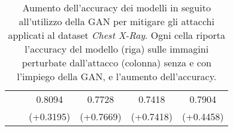 \begin{table}[!h]
\begin{tabular}{|c||c|c|c|c|c|}
                                       & & 0.8094 & 0.7728 & 0.7418 & 0.7904\\ 
                     \rule[-3mm]{0mm}{8mm}
                     & & (+0.3195) & (+0.7669) & (+0.7418) & (+0.4458)\\
                    \hline
                \end{tabular}
                \caption{Aumento dell'accuracy dei modelli in seguito all'utilizzo della GAN per mitigare gli attacchi applicati al dataset \textit{Chest X-Ray}.
                Ogni cella riporta l'accuracy del modello (riga) sulle immagini perturbate dall'attacco (colonna) senza e con l'impiego della GAN, e l'aumento dell'accuracy.}
                \label{Rise accuracy Chest X-Ray}
            \end{table}
            
